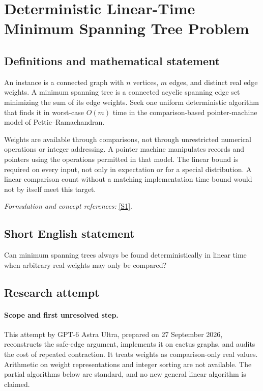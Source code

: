 \documentclass[11pt]{article}
\begin{document}
\section*{\texorpdfstring{Deterministic Linear-Time Minimum Spanning Tree Problem}{Deterministic Linear-Time Minimum Spanning Tree Problem}}\label{437}
\subsection{Definitions and mathematical statement}
An instance is a connected graph with $n$ vertices, $m$ edges, and distinct real edge weights. A minimum spanning tree is a connected acyclic spanning edge set minimizing the sum of its edge weights. Seek one uniform deterministic algorithm that finds it in worst-case $O(m)$ time in the comparison-based pointer-machine model of Pettie--Ramachandran.

Weights are available through comparisons, not through unrestricted numerical operations or integer addressing. A pointer machine manipulates records and pointers using the operations permitted in that model. The linear bound is required on every input, not only in expectation or for a special distribution. A linear comparison count without a matching implementation time bound would not by itself meet this target.
\par\smallskip\textit{Formulation and concept references:} \href{https://web.eecs.umich.edu/~pettie/papers/jacm-optmsf.pdf}{[S1]}.

\subsection{Short English statement}
Can minimum spanning trees always be found deterministically in linear time when arbitrary real weights may only be compared?
\subsection{Research attempt}
\paragraph{Scope and first unresolved step.}
This attempt by GPT-6 Astra Ultra, prepared on 27 September 2026, reconstructs the safe-edge argument, implements it on cactus graphs, and audits the cost of repeated contraction. It treats weights as comparison-only real values. Arithmetic on weight representations and integer sorting are not available. The partial algorithms below are standard, and no new general linear algorithm is claimed.
\end{document}

